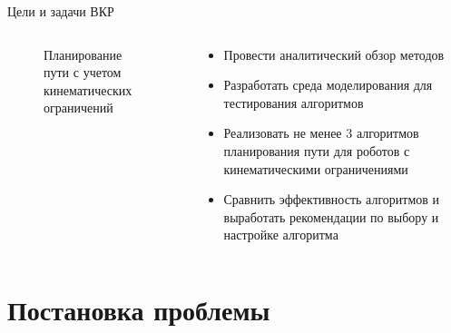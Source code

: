 \documentclass[11pt, aspectratio=169]{beamer}
\begin{document}
\begin{frame}{Цели и задачи ВКР}
    \begin{columns}[onlytextwidth]
        \begin{column}{0.4\textwidth}
            \begin{figure}[ht]
                \centering
                \caption{Планирование пути с учетом кинематических ограничений}
            \end{figure}
        \end{column}
        \begin{column}{0.6\textwidth}
            \begin{itemize}
                \item Провести аналитический обзор методов
                \item Разработать среда моделирования для тестирования алгоритмов
                \item Реализовать не менее 3 алгоритмов планирования пути для роботов с кинематическими ограничениями
                \item Сравнить эффективность алгоритмов и выработать рекомендации по выбору  и настройке алгоритма
            \end{itemize}
        \end{column}
    \end{columns}
\end{frame}

\section{Постановка проблемы}
\end{document}
